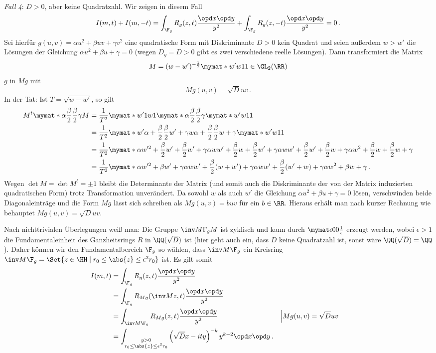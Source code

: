 \emph{Fall 4}: $D > 0$, aber keine Quadratzahl. Wir zeigen in diesem Fall
\[
	I(m,t) + I(m,-t) = \int_{\F_g} R_g (z, t) \frac {\opd x \opd y}{y^2} + \int_{\F_g} R_g (z, -t) \frac {\opd x \opd y}{y^2} = 0
	\,.
\]
Sei hierfür $g(u, v) = \alpha u^2 + \beta uv + \gamma v^2$ eine quadratische Form mit Diskriminante $D > 0$ kein Quadrat und seien außerdem $w > w'$ die Lösungen der Gleichung $\alpha u^2 + \beta u + \gamma = 0$ (wegen $D_g = D > 0$ gibt es zwei verschiedene reelle Lösungen). Dann transformiert die Matrix
\[
	M = (w - w')^{- \frac 12} \mymat*{w'}w11 \in \GL_2(\RR)
\]
$g$ in $Mg$ mit
\[
	M g(u, v) = \sqrt{D} uv
	\,.
\]
In der Tat: Ist $T = \sqrt{w-w'}$, so gilt
\begin{align*}
	M^t \mymat*{\alpha}{\frac \beta 2}{\frac \beta 2}{\gamma} M 
	&= \frac{1}{T^2} \mymat*{w'}1w1 \mymat*{\alpha}{\frac \beta 2}{\frac \beta 2}{\gamma} \mymat*{w'}w11 \\
	&= \frac{1}{T^2} \mymat*{w' \alpha + \frac \beta 2}{\frac \beta 2 w' + \gamma}{w \alpha + \frac \beta 2}{\frac \beta 2 w + \gamma} \mymat*{w'}w11 \\
	&= \frac{1}{T^2} \mymat*{\alpha w'^2 + \frac \beta 2 w' + \frac \beta 2 w' + \gamma}{\alpha ww' + \frac \beta 2 w + \frac \beta 2 w' + \gamma}{\alpha ww' + \frac \beta 2 w' + \frac \beta 2 w + \gamma}{\alpha w^2 + \frac \beta 2 w + \frac \beta 2 w + \gamma} \\
	&= \frac{1}{T^2} \mymat*{\alpha w'^2 + \beta w' + \gamma}{\alpha ww' + \frac \beta 2 (w + w') + \gamma}{\alpha ww' + \frac \beta 2 (w' + w) + \gamma}{\alpha w^2 + \beta w + \gamma}
	\,.
\end{align*}
Wegen $\det M = \det M^t = \pm 1$ bleibt die Determinante der Matrix (und somit auch die Diskriminante der von der Matrix induzierten quadratischen Form) trotz Transformation unverändert. Da sowohl $w$ als auch $w'$ die Gleichung $\alpha u^2 + \beta u + \gamma = 0$ lösen, verschwinden beide Diagonaleinträge und die Form $Mg$ lässt sich schreiben als $Mg(u, v) = b uv$ für ein $b \in \RR$. Hieraus erhält man nach kurzer Rechnung wie behauptet $Mg(u, v) = \sqrt D uv$.

Nach nichttrivialen Überlegungen weiß man: Die Gruppe $\inv M \Gamma_g M$ ist zyklisch und kann durch $\mymat \epsilon 0 0 {\frac 1 \epsilon}$ erzeugt werden, wobei $\epsilon > 1$ die Fundamentaleinheit des Ganzheitsrings $R$ in $\QQ(\sqrt{D})$ ist (hier geht auch ein, dass $D$ keine Quadratzahl ist, sonst wäre $\QQ(\sqrt{D}) = \QQ$). Daher können wir den Fundamentalbereich $\F_g$ so wählen, dass $\inv M \F_g$ ein Kreisring $\inv M \F_g = \Set {z \in \HH \mid r_0 \leq \abs{z} \leq \epsilon^2 r_0}$ ist. Es gilt somit
\begin{align*}
	I(m,t)
	&= \int_{\F_g} R_g (z, t) \frac {\opd x \opd y}{y^2} \\
	&= \int_{\F_g} R_{M g} (\inv M z, t) \frac {\opd x \opd y}{y^2} \\
	&= \int_{\inv M \F_g} R_{M g} (z, t) \frac {\opd x \opd y}{y^2} && \Big| Mg(u,v) = \sqrt{D} uv \\
	&= \int_{\substack{y > 0 \\ r_0 \leq \abs{z} \leq \epsilon^2 r_0}} \left( \sqrt{D}x - ity \right)^{-k} y^{k-2} \opd x \opd y
	\,.
\end{align*}

